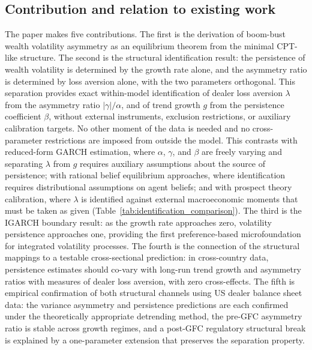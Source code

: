 \documentclass[12pt,a4paper]{article}
\theoremstyle{definition}
\begin{document}
\subsection{Contribution and relation to existing work}
\label{sec:contribution}

The paper makes five contributions. The first is the derivation of
boom-bust wealth volatility asymmetry as an equilibrium theorem from the
minimal CPT-like structure. The second is the structural identification
result: the persistence of wealth volatility is determined by the growth
rate alone, and the asymmetry ratio is determined by loss aversion alone,
with the two parameters orthogonal. This separation provides exact
within-model identification of dealer loss aversion $\lambda$ from the
asymmetry ratio $|\gamma|/\alpha$, and of trend growth $g$ from the
persistence coefficient $\beta$, without external instruments, exclusion
restrictions, or auxiliary calibration targets. No other moment of the
data is needed and no cross-parameter restrictions are imposed from
outside the model. This contrasts with reduced-form GARCH estimation,
where $\alpha$, $\gamma$, and $\beta$ are freely varying and separating
$\lambda$ from $g$ requires auxiliary assumptions about the source of
persistence; with rational belief equilibrium approaches, where
identification requires distributional assumptions on agent beliefs; and
with prospect theory calibration, where $\lambda$ is identified against
external macroeconomic moments that must be taken as given
(Table~\ref{tab:identification_comparison}). The third is the IGARCH boundary
result: as the growth rate approaches zero, volatility persistence approaches
one, providing the first preference-based microfoundation for integrated
volatility processes. The fourth is the connection of the structural mappings
to a testable cross-sectional prediction: in cross-country data, persistence
estimates should co-vary with long-run trend growth and asymmetry ratios
with measures of dealer loss aversion, with zero cross-effects. The fifth
is empirical confirmation of both structural channels using US dealer
balance sheet data: the variance asymmetry and persistence predictions
are each confirmed under the theoretically appropriate detrending method,
the pre-GFC asymmetry ratio is stable across growth regimes, and a
post-GFC regulatory structural break is explained by a one-parameter
extension that preserves the separation property.
\end{document}
